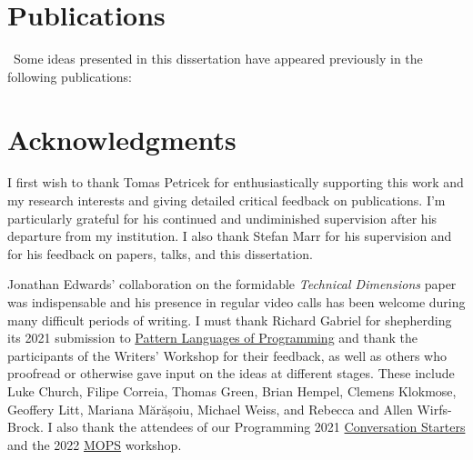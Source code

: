 \documentclass[ twoside,openright,titlepage,numbers=noenddot,headinclude,footinclude,cleardoublepage=empty,abstract=on,
                BCOR=5mm,paper=a4,fontsize=11pt
                ]{scrreprt}
\newcommand{\eg}{e.\,g.}
\newcommand{\joel}[1]{}
\theoremstyle{definition}
\begin{document}
\vfill

\endgroup

\vfill
\clearpage{}
\cleardoublepage\clearpage{}
\chapter*{Publications}\
Some ideas presented in this dissertation have appeared previously in the following publications:



\begin{refsection}[ownpubs]
    \small
    \nocite{*} \printbibliography[heading=none]
\end{refsection}

\joel{
\emph{Attention}: This requires a separate run of \texttt{bibtex} for your \texttt{refsection}, \eg, \texttt{ClassicThesis1-blx} for this file. You might also use \texttt{biber} as the backend for \texttt{biblatex}. See also \url{http://tex.stackexchange.com/questions/128196/problem-with-refsection}.
}
\clearpage{}
\cleardoublepage\clearpage{}

\begingroup
\let\clearpage\relax
\let\cleardoublepage\relax
\let\cleardoublepage\relax
\chapter*{Acknowledgments}
I first wish to thank Tomas Petricek for enthusiastically supporting
this work and my research interests and giving detailed critical
feedback on publications. I'm particularly grateful for his continued
and undiminished supervision after his departure from my institution. I
also thank Stefan Marr for his supervision and for his feedback on
papers, talks, and this dissertation.

Jonathan Edwards' collaboration on the formidable \emph{Technical
Dimensions} paper was indispensable and his presence in regular video
calls has been welcome during many difficult periods of writing. I must
thank Richard Gabriel for shepherding its 2021 submission to
\href{https://www.hillside.net/plop/2021/index.php?nav=PLoP21}{Pattern
Languages of Programming} and thank the participants of the Writers'
Workshop for their feedback, as well as others who proofread or
otherwise gave input on the ideas at different stages. These include
Luke Church, Filipe Correia, Thomas Green, Brian Hempel, Clemens
Klokmose, Geoffery Litt, Mariana Mărășoiu, Michael Weiss, and Rebecca
and Allen Wirfs-Brock. I also thank the attendees of our Programming
2021
\href{https://2021.programming-conference.org/track/programming-2021-conversation-starters}{Conversation
Starters} and the 2022
\href{https://2022.programming-conference.org/home/mops-2022}{MOPS}
workshop.
\end{document}
